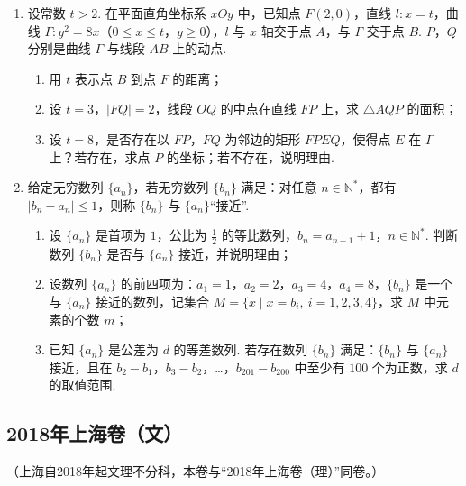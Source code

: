\begin{description}
\begin{enumerate}[leftmargin=5pt]
        \item 设常数 \(t>2\). 在平面直角坐标系 \(xOy\) 中，已知点 \(F(2,0)\)，直线 \(l:x=t\)，曲线 \(\Gamma:y^2=8x\)（\(0\le x\le t\)，\(y\ge0\)），\(l\) 与 \(x\) 轴交于点 \(A\)，与 \(\Gamma\) 交于点 \(B\). \(P\)，\(Q\) 分别是曲线 \(\Gamma\) 与线段 \(AB\) 上的动点.

\begin{enumerate}
\item 用 \(t\) 表示点 \(B\) 到点 \(F\) 的距离；
\item 设 \(t=3\)，\(\lvert FQ\rvert=2\)，线段 \(OQ\) 的中点在直线 \(FP\) 上，求 \(\triangle AQP\) 的面积；
\item 设 \(t=8\)，是否存在以 \(FP\)，\(FQ\) 为邻边的矩形 \(FPEQ\)，使得点 \(E\) 在 \(\Gamma\) 上？若存在，求点 \(P\) 的坐标；若不存在，说明理由.
\end{enumerate}

        \item 给定无穷数列 \(\{a_n\}\)，若无穷数列 \(\{b_n\}\) 满足：对任意 \(n\in\mathbb{N}^*\)，都有 \(\lvert b_n-a_n\rvert\le1\)，则称 \(\{b_n\}\) 与 \(\{a_n\}\)“接近”.

\begin{enumerate}
\item 设 \(\{a_n\}\) 是首项为 \(1\)，公比为 \(\frac12\) 的等比数列，\(b_n=a_{n+1}+1\)，\(n\in\mathbb{N}^*\). 判断数列 \(\{b_n\}\) 是否与 \(\{a_n\}\) 接近，并说明理由；
\item 设数列 \(\{a_n\}\) 的前四项为：\(a_1=1\)，\(a_2=2\)，\(a_3=4\)，\(a_4=8\)，\(\{b_n\}\) 是一个与 \(\{a_n\}\) 接近的数列，记集合 \(M=\{x\mid x=b_i,\ i=1,2,3,4\}\)，求 \(M\) 中元素的个数 \(m\)；
\item 已知 \(\{a_n\}\) 是公差为 \(d\) 的等差数列. 若存在数列 \(\{b_n\}\) 满足：\(\{b_n\}\) 与 \(\{a_n\}\) 接近，且在 \(b_2-b_1\)，\(b_3-b_2\)，\ldots，\(b_{201}-b_{200}\) 中至少有 \(100\) 个为正数，求 \(d\) 的取值范围.
\end{enumerate}

    \end{enumerate}

\end{description}


\subsection{2018年上海卷（文）}\label{gk:2018年上海卷（文）}

（上海自2018年起文理不分科，本卷与“2018年上海卷（理）”同卷。）


